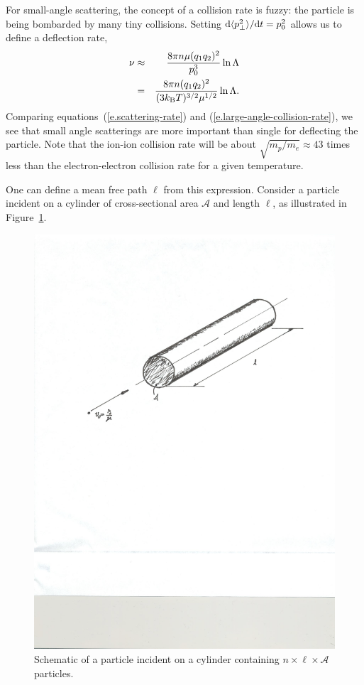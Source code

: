 For small-angle scattering, the concept of a collision rate is fuzzy: the particle is being bombarded by many tiny collisions.  Setting $\mathrm{d} \langle p_{\bot}^{2}\rangle/\mathrm{d} t = p_{0}^{2}$ allows us to define a deflection rate,
\begin{eqnarray}\label{e.scattering-rate}
\nu &\approx& \frac{8\pi n \mu (q_{1}q_{2})^{2}}{p_{0}^{3}} \ln\Lambda\\
 &=& \frac{8\pi n (q_{1}q_{2})^{2}}{(3k_\mathrm{B} T)^{3/2}\mu^{1/2}}\ln\Lambda.
\end{eqnarray}
Comparing equations~(\ref{e.scattering-rate}) and (\ref{e.large-angle-collision-rate}), we see that small angle scatterings are more important than single for deflecting the particle. Note that the ion-ion collision rate will be about $\sqrt{m_{p}/m_{e}} \approx 43$ times less than the electron-electron collision rate for a given temperature.

One can define a mean free path $\ell$ from this expression. Consider a particle incident on a cylinder of cross-sectional area $\mathcal{A}$ and length $\ell$, as illustrated in Figure~\ref{f.mfp}.

\begin{figure}[htbp]
\includegraphics[width=\textwidth]{mean-free-path}
\caption{Schematic of a particle incident on a cylinder containing $n\times\ell\times\mathcal{A}$ particles.}
\label{f.mfp}
\end{figure}

